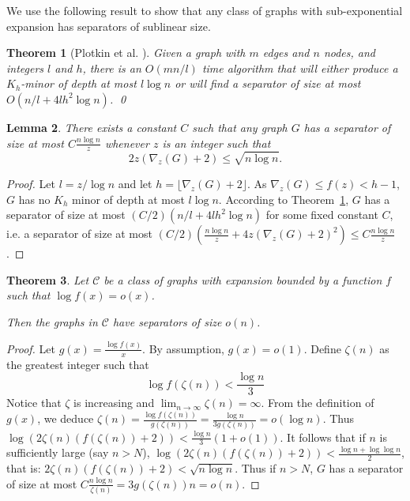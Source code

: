 \documentclass[a4paper]{amsart}
\newtheorem{theorem}{Theorem}[section]
\newtheorem{lemma}[theorem]{Lemma}
\theoremstyle{definition}
\theoremstyle{remark}
\newcommand{\rdens}[1]{\nabla_{#1}}
\begin{document}
We use the following result to show that any class of graphs with 
sub-exponential
expansion has separators of sublinear size.


\begin{theorem}[Plotkin et al. \cite{shallow}]
\label{th:plot}
Given a graph with $m$ edges and $n$ nodes, and integers $l$ and $h$,
there is an $O(mn/l)$ time algorithm that will either produce a
$K_h$-minor of depth at most $l \log n$ or will find a separator of
size at most $O(n/l+4lh^2\log n)$.
\qed
\end{theorem}

\begin{lemma}
There exists a constant $C$ such that any 
graph $G$ has a separator of size at most $C\frac{n\log n}{z}$
whenever $z$ is an integer such that
\begin{equation}
2z(\rdens{z}(G)+2)\leq\sqrt{n\log n}.
\label{eq:z}
\end{equation}
\end{lemma}
\begin{proof}
Let $l=z/\log n$ and let $h=\lfloor \rdens{z}(G)+2\rfloor$. As
$\rdens{z}(G)\leq f(z)<h-1$, $G$ has no $K_h$ minor of depth at most
$l \log n$. According to Theorem~\ref{th:plot}, $G$ has a separator
of size at most $(C/2)(n/l+4lh^2\log n)$ for some fixed constant $C$, 
i.e. a separator of size at most
$(C/2)(\frac{n\log n}{z}+4z(\rdens{z}(G)+2)^2)\leq
C\frac{n\log n}{z}$.
\end{proof}
\begin{theorem}
\label{th:vs}
Let $\mathcal C$ be a class of graphs with expansion bounded
by a function $f$ such that $\log f(x)=o(x)$.

Then the graphs in $\mathcal C$ have separators of size $o(n)$.
\end{theorem}
\begin{proof}
Let $g(x)=\frac{\log f(x)}{x}$. By assumption,
$g(x)=o(1)$.
Define $\zeta(n)$ as the greatest integer such that
\begin{equation*}
\log f(\zeta(n))<\frac{\log n}{3}
\end{equation*}
Notice that $\zeta$ is increasing and $\lim_{n\rightarrow\infty}\zeta(n)=\infty$.
From the definition of $g(x)$, we deduce
 $\zeta(n)=\frac{\log f(\zeta(n))}{g(\zeta(n))}=\frac{\log
n}{3g(\zeta(n))}=o(\log n)$.
Thus $\log (2\zeta(n)(f(\zeta(n))+2))<\frac{\log
n}{3}(1+o(1))$. It follows that if $n$ is
sufficiently large (say $n>N$),  $\log (2\zeta(n)(f(\zeta(n))+2))<\frac{\log
n+\log\log n}{2}$, that is: $2\zeta(n)(f(\zeta(n))+2)<\sqrt{n\log
n}$. Thus if $n>N$, $G$ has a separator of size at most
$C\frac{n\log n}{\zeta(n)}=3g(\zeta(n))n=o(n)$.
\end{proof}
\end{document}
